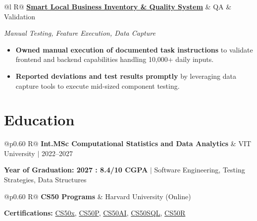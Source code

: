 \documentclass[a4paper,11pt]{article}
\newcommand{\subheading}[1]{\textbf{#1}}
\newcommand{\meta}[1]{{\fontsize{10}{12}\selectfont\textcolor[HTML]{3A3A3A}{#1}}}
\newcommand{\techstack}[1]{{\fontsize{10}{12}\selectfont\textcolor[HTML]{1A1A1A}{\textit{#1}}}}
\newcommand{\ulink}[2]{\href{#1}{#2}}
\begin{document}
\begin{tabularx}{\linewidth}{@{}l R@{}}
\subheading{\ulink{https://github.com/su-jin1425/Smart-Local-Business-Inventory-Billing-System}{Smart Local Business Inventory \& Quality System}} & \meta{QA \& Validation}
\end{tabularx}
\techstack{Manual Testing, Feature Execution, Data Capture}
\begin{itemize}[nosep, leftmargin=1.5em, itemsep=2pt, topsep=2pt]
  \item {\color[HTML]{0A0A0A}\fontsize{11}{14}\selectfont \textbf{Owned manual execution of documented task instructions} to validate frontend and backend capabilities handling 10,000+ daily inputs.}
  \item {\color[HTML]{0A0A0A}\fontsize{11}{14}\selectfont \textbf{Reported deviations and test results promptly} by leveraging data capture tools to execute mid-sized component testing.}
\end{itemize}

\section{Education}
\vspace{2pt}

\begin{tabularx}{\linewidth}{@{}p{0.60\linewidth} R@{}}
\subheading{Int.MSc Computational Statistics and Data Analytics} & \meta{VIT University $|$ 2022--2027}
\end{tabularx}
{\color[HTML]{3A3A3A}\fontsize{11}{14}\selectfont \textbf{Year of Graduation: 2027 : 8.4/10 CGPA} $|$ Software Engineering, Testing Strategies, Data Structures}

\begin{tabularx}{\linewidth}{@{}p{0.60\linewidth} R@{}}
\subheading{CS50 Programs} & \meta{Harvard University (Online)}
\end{tabularx}
{\color[HTML]{3A3A3A}\fontsize{11}{14}\selectfont \textbf{Certifications:} \ulink{https://cs50.harvard.edu/certificates/b14b78df-e05c-413e-a607-1dd27303053a}{CS50x}, \ulink{https://cs50.harvard.edu/certificates/32477052-9db4-49c4-a5a4-d7e58429ca2c}{CS50P}, \ulink{https://cs50.harvard.edu/certificates/9cdb4d4a-1250-4f8e-9fd7-191864e0f919}{CS50AI}, \ulink{https://cs50.harvard.edu/certificates/bc486f24-f085-4e61-8536-80940b97a1b9}{CS50SQL}, \ulink{https://cs50.harvard.edu/certificates/666838e6-a053-4d82-b179-a60fe745fd84}{CS50R}}

\end{document}
